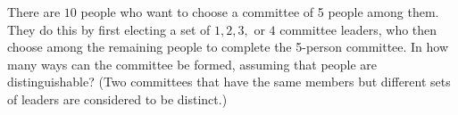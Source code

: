 There are $10$ people who want to choose a committee of 5 people among them. They do this by first electing a set of $1, 2, 3,$ or $4$ committee leaders, who then choose among the remaining people to complete the 5-person committee. In how many ways can the committee be formed, assuming that people are distinguishable? (Two committees that have the same members but different sets of leaders are considered to be distinct.)